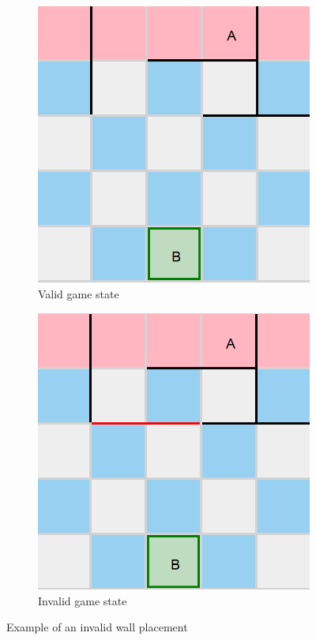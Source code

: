 \begin{figure}[!ht]
    \begin{subfigure}{0.4\textwidth}
      \includegraphics[width=\textwidth]{../img/GameBoard/arbitrary_state.png}
      \caption{Valid game state}
      \label{fig:ValidState}
    \end{subfigure}
    \hfill
    \begin{subfigure}{0.4\textwidth}
      \includegraphics[width=\textwidth]{../img/GameBoard/invalid_wall.png}
      \caption{Invalid game state}
      \label{fig:WallBlocked}
    \end{subfigure}
    \caption{Example of an invalid wall placement}
    \label{fig:WallBlockingMove}
\end{figure}

